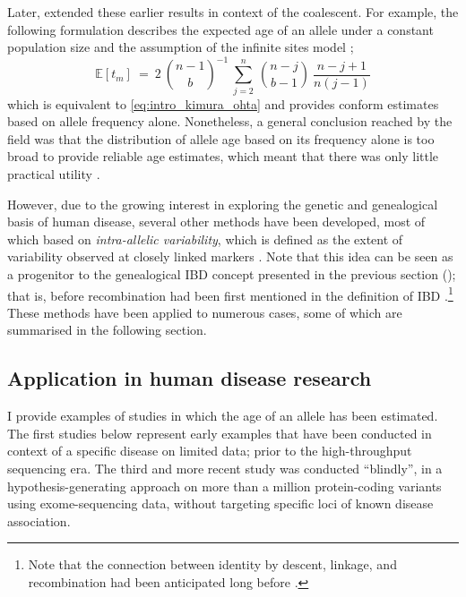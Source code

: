 Later, \citet{Griffiths:2013ec} extended these earlier results in context of the coalescent.
For example, the following formulation describes the expected age of an allele under a constant population size and the assumption of the infinite sites model \citep{Kimura:1969tn,Watterson:1975ur};
\begin{equation}\label{eq:intro_griffiths_tavare}
	\mathbb{E}\left[t_m\right]~=~2~{{n-1}\choose{b}}^{-1}~\sum_{j=2}^{n}~{{n-j}\choose{b-1}}~\frac{n-j+1}{n(j-1)}
\end{equation}
which is equivalent to \cref{eq:intro_kimura_ohta} and provides conform estimates based on allele frequency alone.
Nonetheless, a general conclusion reached by the field was that the distribution of allele age based on its frequency alone is too broad to provide reliable age estimates, which meant that there was only little practical utility \citep[see][]{Slatkin:2000bi}.

However, due to the growing interest in exploring the genetic and genealogical basis of human disease, several other methods have been developed, most of which based on \emph{intra-allelic variability}, which is defined as the extent of variability observed at closely linked markers \citep{Slatkin:2000us,Slatkin:2001wr}.
Note that this idea can be seen as a progenitor to the genealogical IBD concept presented in the previous section (); that is, before recombination had been first mentioned in the definition of IBD \citep{Hayes:2003gj}.\footnote{Note that the connection between identity by descent, linkage, and recombination had been anticipated long before \citep[\eg see][]{Donnelly:1983fi}.}
These methods have been applied to numerous cases, some of which are summarised in the following section.


%
\subsection{Application in human disease research}
%

I provide  examples of studies in which the age of an allele has been estimated.
The first  studies below represent early examples that have been conducted in context of a specific disease on limited data; \ie prior to the high-throughput sequencing era.
The third and more recent study was conducted ``blindly'', in a hypothesis-generating approach on more than a million protein-coding variants using exome-sequencing data, without targeting specific loci of known disease association.

